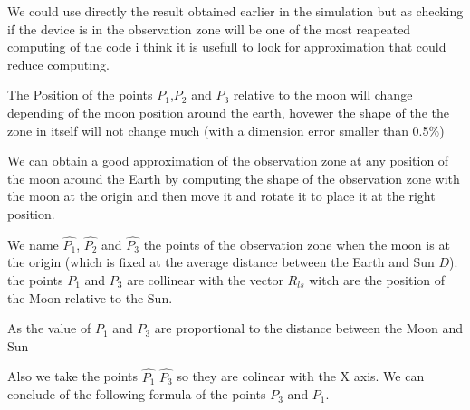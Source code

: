 \documentclass{article} %
\begin{document}
		We could use directly the result obtained earlier in the simulation but as checking if the device is in the observation zone will be one of the most reapeated computing of the code i think it is usefull to look for approximation that could reduce computing.
		
		The Position of the points $P_1$,$P_2$ and $P_3$ relative to the moon will change depending of the moon position around the earth, hovewer the shape of the the zone in itself will not change much (with a dimension error smaller than 0.5\%)
		
		
		We can obtain a good approximation of the observation zone at any position of the moon around the Earth by computing the shape of the observation zone with the moon at the origin and then move it and rotate it to place it at the right position.
		
		
		
		We name $\hat{P_1}$, $\hat{P_2}$ and $\hat{P_3}$ the points of the observation zone when the moon is at the origin (which is fixed at the average distance between the Earth and Sun $D$). the points $P_1$ and $P_3$ are collinear with the vector $R_{ls}$ witch are the position of the Moon relative to the Sun.
		
		As the value of $P_1$ and $P_3$ are proportional to the distance between the Moon and Sun 
		
		Also we take the points $\hat{P_1}$ $\hat{P_3}$ so they are colinear with the X axis. We can conclude of the following formula of the points $P_3$ and $P_1$.
		
		
\end{document}

